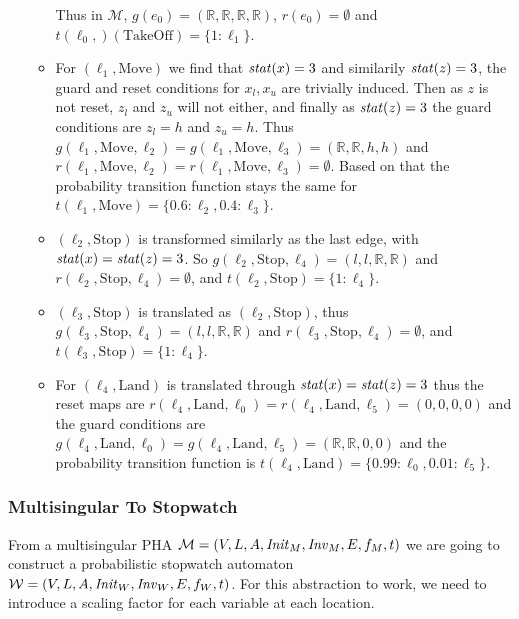 \begin{ex}
\begin{itemize}
\begin{itemize}
        Thus in $\mathcal{M}$, $g(e_{0})=(\mathbb{R},\mathbb{R},\mathbb{R},\mathbb{R})$, $r(e_{0})=\emptyset$ and $t(\ell_{0},)(\text{TakeOff})=\{1:\ell_{1}\}$.
        \item For $(\ell_{1},\text{Move})$ we find that $\mathit{stat}(x)=3$ and similarily $\mathit{stat}(z)=3$, the guard and reset conditions for $x_{l},x_{u}$ are trivially induced. Then as $z$ is not reset, $z_{l}$ and $z_{u}$ will not either, and finally as $\mathit{stat}(z)=3$ the guard conditions are $z_{l}=h$ and $z_{u}=h$.
        Thus $g(\ell_{1},\text{Move},\ell_{2})=g(\ell_{1},\text{Move},\ell_{3})=(\mathbb{R},\mathbb{R},h,h)$ and $r(\ell_{1},\text{Move},\ell_{2})=r(\ell_{1},\text{Move},\ell_{3})=\emptyset$.
        Based on that the probability transition function stays the same for $t(\ell_{1},\text{Move})=\{0.6:\ell_{2},0.4:\ell_{3}\}$.
        \item $(\ell_{2},\text{Stop})$ is transformed similarly as the last edge, with $\mathit{stat}(x)=\mathit{stat}(z)=3$. So $g(\ell_{2},\text{Stop},\ell_{4})=(l,l,\mathbb{R},\mathbb{R})$ and $r(\ell_{2},\text{Stop},\ell_{4})=\emptyset$, and $t(\ell_{2},\text{Stop})=\{1:\ell_{4}\}$.
        \item $(\ell_{3},\text{Stop})$ is translated as $(\ell_{2},\text{Stop})$, thus
        $g(\ell_{3},\text{Stop},\ell_{4})=(l,l,\mathbb{R},\mathbb{R})$ and $r(\ell_{3},\text{Stop},\ell_{4})=\emptyset$, and $t(\ell_{3},\text{Stop})=\{1:\ell_{4}\}$.
        \item For $(\ell_{4},\text{Land})$ is translated through $\mathit{stat}(x)=\mathit{stat}(z)=3$ thus the reset maps are $r(\ell_{4},\text{Land},\ell_{0})=r(\ell_{4},\text{Land},\ell_{5})=(0,0,0,0)$ and the guard conditions are $g(\ell_{4},\text{Land},\ell_{0})=g(\ell_{4},\text{Land},\ell_{5})=(\mathbb{R},\mathbb{R},0,0)$ and the probability transition function is $t(\ell_{4},\text{Land})=\{0.99:\ell_{0},0.01:\ell_{5}\}$.
    \end{itemize}
\end{itemize}

\end{ex}
\subsubsection{Multisingular To Stopwatch}
From a multisingular PHA $\mathcal{M} = (V,L,A,\mathit{Init}_{M},\mathit{Inv}_{M},E,f_{M},t)$ we are going to construct a probabilistic stopwatch automaton $\mathcal{W} = (V,L,A,\mathit{Init}_{W},\mathit{Inv}_{W},E,f_{W},t)$. For this abstraction to work, we need to introduce a scaling factor for each variable at each location.

